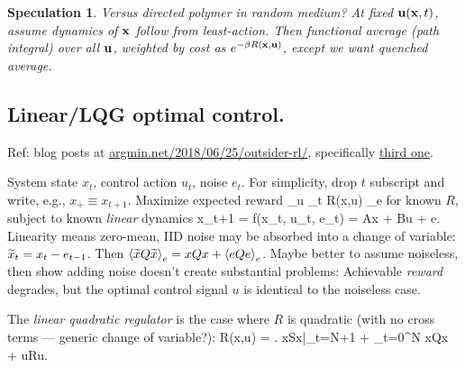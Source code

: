 \documentclass[notitlepage,openany,11pt]{report}
\theoremstyle{plain}%
\newtheorem{notethm}{Speculation}
\newenvironment{notebox}
    {\noindent\colorlet{shadecolor}{cyan!15}\begin{shaded}\begin{notethm}}
    {\end{notethm}\end{shaded}}
\numberwithin{equation}{section}
\begin{document}
\begin{notebox}
Versus directed polymer in random medium? At fixed $\mathbf{u}(\mathbf{x},t)$, assume dynamics of $\mathbf{x}$ follow from least-action. Then functional average (path integral) over all $\mathbf{u}$, weighted by cost as $e^{-\beta R(\mathbf{x},\mathbf{u})}$, except we want quenched average.
\end{notebox}


\subsection{Linear/LQG optimal control.}

Ref: blog posts at \href{http://www.argmin.net/2018/06/25/outsider-rl/}{argmin.net/2018/06/25/outsider-rl/}, specifically \href{http://www.argmin.net/2018/02/08/lqr/}{third one}.

System state $x_{t}$, control action $u_{t}$, noise $e_{t}$. For simplicity, drop $t$ subscript and write, e.g., $x_{+} \equiv x_{t+1}$. Maximize expected reward
\be
\arg \max_{u} \left\langle \sum_{t} R(x,u) \right\rangle_{e}
\ee
for known $R$, subject to known \emph{linear} dynamics
\be
x_{t+1} = f(x_{t}, u_{t}, e_{t}) = Ax + Bu + e.
\ee
Linearity means zero-mean, IID noise may be absorbed into a change of variable: $\widetilde{x}_{t} = x_{t} - e_{t-1}$. Then $\left\langle \widetilde{x} Q \widetilde{x} \right\rangle_{e} = xQx + \left\langle e Q e \right\rangle_{e}$. Maybe better to assume noiseless, then show adding noise doesn't create substantial problems: Achievable \emph{reward} degrades, but the optimal control signal $u$ is identical to the noiseless case.

The \emph{linear quadratic regulator} is the case where $R$ is quadratic (with no cross terms --- generic change of variable?):
\be
R(x,u) = \left. xSx\right|_{t=N+1} +  \sum_{t=0}^{N} xQx + uRu.
\ee
{}
\end{document}

